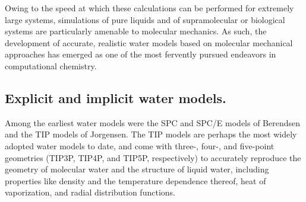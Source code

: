 \documentclass[12pt]{report}
\begin{document}
Owing to the speed at which these calculations can be performed for extremely large systems, simulations of pure liquids and of supramolecular or biological systems are particularly amenable to molecular mechanics. As such, the development of accurate, realistic water models based on molecular mechanical approaches has emerged as one of the most fervently pursued endeavors in computational chemistry. 


\subsection{Explicit and implicit water models.}

Among the earliest water models were the SPC and SPC/E models of Berendsen \cite{berendsen} and the TIP models of Jorgensen. \cite{jorg1982, jorg1983, mahoney} The TIP models are perhaps the most widely adopted water models to date, and come with three-, four-, and five-point geometries (TIP3P, TIP4P, and TIP5P, respectively) to accurately reproduce the geometry of molecular water and the structure of liquid water, including properties like density and the temperature dependence thereof, heat of vaporization, and radial distribution functions. 
\end{document}
